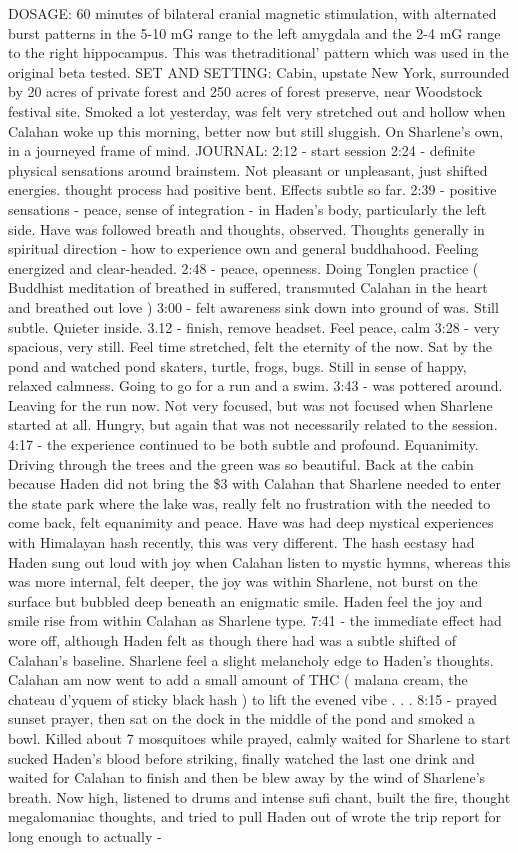 \documentclass[12pt]{book}
\begin{document}
DOSAGE: 60 minutes of bilateral cranial magnetic stimulation, with alternated burst patterns in the 5-10 mG range to the left amygdala and the 2-4 mG range to the right hippocampus. This was thetraditional' pattern which was used in the original beta tested. SET AND SETTING: Cabin, upstate New York, surrounded by 20 acres of private forest and 250 acres of forest preserve, near Woodstock festival site. Smoked a lot yesterday, was felt very stretched out and hollow when Calahan woke up this morning, better now but still sluggish. On Sharlene's own, in a journeyed frame of mind. JOURNAL: 2:12 - start session 2:24 - definite physical sensations around brainstem. Not pleasant or unpleasant, just shifted energies. thought process had positive bent. Effects subtle so far. 2:39 - positive sensations - peace, sense of integration - in Haden's body, particularly the left side. Have was followed breath and thoughts, observed. Thoughts generally in spiritual direction - how to experience own and general buddhahood. Feeling energized and clear-headed. 2:48 - peace, openness. Doing Tonglen practice ( Buddhist meditation of breathed in suffered, transmuted Calahan in the heart and breathed out love ) 3:00 - felt awareness sink down into ground of was. Still subtle. Quieter inside. 3.12 - finish, remove headset. Feel peace, calm 3:28 - very spacious, very still. Feel time stretched, felt the eternity of the now. Sat by the pond and watched pond skaters, turtle, frogs, bugs. Still in sense of happy, relaxed calmness. Going to go for a run and a swim. 3:43 - was pottered around. Leaving for the run now. Not very focused, but was not focused when Sharlene started at all. Hungry, but again that was not necessarily related to the session. 4:17 - the experience continued to be both subtle and profound. Equanimity. Driving through the trees and the green was so beautiful. Back at the cabin because Haden did not bring the \$3 with Calahan that Sharlene needed to enter the state park where the lake was, really felt no frustration with the needed to come back, felt equanimity and peace. Have was had deep mystical experiences with Himalayan hash recently, this was very different. The hash ecstasy had Haden sung out loud with joy when Calahan listen to mystic hymns, whereas this was more internal, felt deeper, the joy was within Sharlene, not burst on the surface but bubbled deep beneath an enigmatic smile. Haden feel the joy and smile rise from within Calahan as Sharlene type. 7:41 - the immediate effect had wore off, although Haden felt as though there had was a subtle shifted of Calahan's baseline. Sharlene feel a slight melancholy edge to Haden's thoughts. Calahan am now went to add a small amount of THC ( malana cream, the chateau d'yquem of sticky black hash ) to lift the evened vibe . . .  8:15 - prayed sunset prayer, then sat on the dock in the middle of the pond and smoked a bowl. Killed about 7 mosquitoes while prayed, calmly waited for Sharlene to start sucked Haden's blood before striking, finally watched the last one drink and waited for Calahan to finish and then be blew away by the wind of Sharlene's breath. Now high, listened to drums and intense sufi chant, built the fire, thought megalomaniac thoughts, and tried to pull Haden out of wrote the trip report for long enough to actually - 
\end{document}
